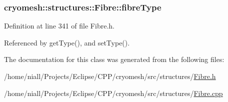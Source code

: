 \hypertarget{classcryomesh_1_1structures_1_1Fibre_acfd2fc68d27c91742e0319b2a0db090a}{
\subsubsection[{fibre\-Type}]{ {\bf cryomesh\-::structures\-::\-Fibre\-::fibre\-Type}}}\label{classcryomesh_1_1structures_1_1Fibre_acfd2fc68d27c91742e0319b2a0db090a}


\-Definition at line 341 of file \-Fibre.\-h.



\-Referenced by get\-Type(), and set\-Type().



\-The documentation for this class was generated from the following files\-:\begin{DoxyCompactItemize}
\item 
/home/niall/\-Projects/\-Eclipse/\-C\-P\-P/cryomesh/src/structures/\hyperlink{Fibre_8h}{\-Fibre.\-h}\item 
/home/niall/\-Projects/\-Eclipse/\-C\-P\-P/cryomesh/src/structures/\hyperlink{Fibre_8cpp}{\-Fibre.\-cpp}\end{DoxyCompactItemize}
